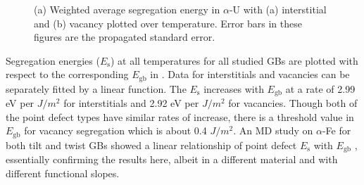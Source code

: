 \documentclass[review]{elsarticle}
\begin{document}
\begin{figure}[h!]
\centering
{} 
\caption{(a) Weighted average segregation energy in $\alpha$-U with (a) interstitial and (b) vacancy plotted over temperature. Error bars in these figures are the propagated standard error. }
\label{fig:SE}
\end{figure}

\par Segregation energies ($E_{\mathrm{s}}$) at all temperatures for all studied GBs are plotted with respect to the corresponding  $E_{\mathrm{gb}}$  in . Data for interstitials and vacancies can be separately fitted by a linear function. The $E_{\mathrm{s}}$ increases with  $E_{\mathrm{gb}}$  at a rate of 2.99 eV per $J/m{^2}$ for interstitials and 2.92 eV per $J/m^2$ for vacancies. Though both of the point defect types have similar rates of increase, there is a threshold value in $E_{\mathrm{gb}}$ for vacancy segregation which is about 0.4 $J/m^2$. An MD study on $\alpha$-Fe for both tilt and twist GBs showed a linear relationship of point defect $E_{\mathrm{s}}$ with $E_{\mathrm{gb}}$ \cite{tschopp2012probing}, essentially confirming the results here, albeit in a different material and with different functional slopes. 
\end{document}
